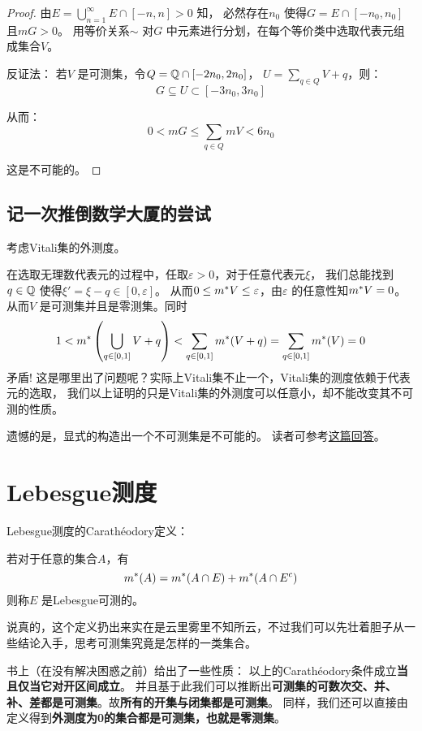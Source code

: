 \begin{proof}
    由\(E= \bigcup_{n=1}^{\infty} E\cap [-n,n]>0\) 知，
    必然存在\(n_{0}\) 使得\(G=E\cap [-n_{0},n_{0}]\) 且\(mG>0\)。
    用等价关系\(\sim\) 对\(G\) 中元素进行分划，在每个等价类中选取代表元组成集合\(V\)。

    反证法： 若\(V\) 是可测集，令\(Q=\mathbb{Q}\cap[-2n_{0},2n_{0}]\)，
    \(U=\sum_{q\in Q} V+q\)，则：
    \[
        G \subseteq U \subset [-3n_{0},3n_{0}]
    \]

    从而： \[
        0<m G\leq \sum_{q\in Q} mV<6n_{0}
    \]

    这是不可能的。
\end{proof}

\subsection{记一次推倒数学大厦的尝试}
考虑Vitali集的外测度。

在选取无理数代表元的过程中，任取\(\varepsilon>0\)，对于任意代表元\(\xi\)，
我们总能找到\(q \in \mathbb{Q}\) 使得\(\xi'=\xi-q \in [0,\varepsilon]\)。
从而\(0\leq m^{*} V\leq \varepsilon\)，由\(\varepsilon\)
的任意性知\(m^{*} V=0\)。从而\(V\) 是可测集并且是零测集。同时\[
    1<m^{*}\left( \bigcup_{q\in [0,1]} V+q  \right) < \sum_{q
    \in [0,1]} m^{*}(V+q) = \sum_{q\in [0,1]} m^{*}(V) = 0
\]
矛盾!
这是哪里出了问题呢？实际上Vitali集不止一个，Vitali集的测度依赖于代表元的选取，
我们以上证明的只是Vitali集的外测度可以任意小，却不能改变其不可测的性质。

遗憾的是，显式的构造出一个不可测集是不可能的。
读者可参考\href{https://math.stackexchange.com/questions/226559/examples-of-non-measurable-sets-in-mathbbr}{这篇回答}。

\section{Lebesgue测度}
Lebesgue测度的Carathéodory定义：
\begin{definition}
    若对于任意的集合\(A\)，有
    \[
        m^{*}(A)=m^{*}(A\cap E)+m^{*}(A\cap E^{c})
    \]
    则称\(E\) 是Lebesgue可测的。
\end{definition}

说真的，这个定义扔出来实在是云里雾里不知所云，不过我们可以先壮着胆子从一些结论入手，思考可测集究竟是怎样的一类集合。

书上（在没有解决困惑之前）给出了一些性质： 以上的Carathéodory条件成立\textbf{当且仅当它对开区间成立}。
并且基于此我们可以推断出\textbf{可测集的可数次交、并、补、差都是可测集}。故\textbf{所有的开集与闭集都是可测集}。
同样，我们还可以直接由定义得到\textbf{外测度为0的集合都是可测集，也就是零测集}。

